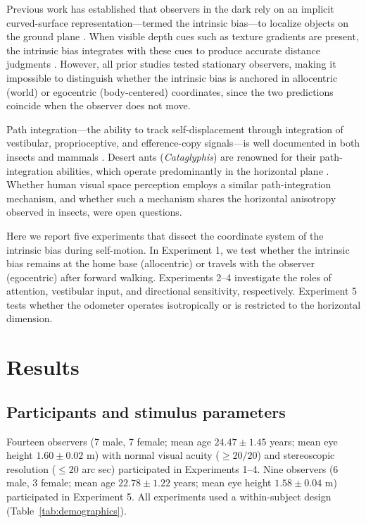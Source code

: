 \documentclass[11pt]{article}
\begin{document}
Previous work has established that observers in the dark rely on an implicit curved-surface representation---termed the intrinsic bias---to localize objects on the ground plane \citep{ooi2006, sinai1998}. When visible depth cues such as texture gradients are present, the intrinsic bias integrates with these cues to produce accurate distance judgments \citep{wu2004, ooi2001}. However, all prior studies tested stationary observers, making it impossible to distinguish whether the intrinsic bias is anchored in allocentric (world) or egocentric (body-centered) coordinates, since the two predictions coincide when the observer does not move.

Path integration---the ability to track self-displacement through integration of vestibular, proprioceptive, and efference-copy signals---is well documented in both insects and mammals \citep{muller2011, etienne2004, mcnaughton2006}. Desert ants (\textit{Cataglyphis}) are renowned for their path-integration abilities, which operate predominantly in the horizontal plane \citep{wehner2003, wittlinger2006}. Whether human visual space perception employs a similar path-integration mechanism, and whether such a mechanism shares the horizontal anisotropy observed in insects, were open questions.

Here we report five experiments that dissect the coordinate system of the intrinsic bias during self-motion. In Experiment 1, we test whether the intrinsic bias remains at the home base (allocentric) or travels with the observer (egocentric) after forward walking. Experiments 2--4 investigate the roles of attention, vestibular input, and directional sensitivity, respectively. Experiment 5 tests whether the odometer operates isotropically or is restricted to the horizontal dimension.

\section{Results}

\subsection{Participants and stimulus parameters}

Fourteen observers (7 male, 7 female; mean age $24.47 \pm 1.45$ years; mean eye height $1.60 \pm 0.02$ m) with normal visual acuity ($\geq 20/20$) and stereoscopic resolution ($\leq 20$ arc sec) participated in Experiments 1--4. Nine observers (6 male, 3 female; mean age $22.78 \pm 1.22$ years; mean eye height $1.58 \pm 0.04$ m) participated in Experiment 5. All experiments used a within-subject design (Table~\ref{tab:demographics}).
\end{document}
